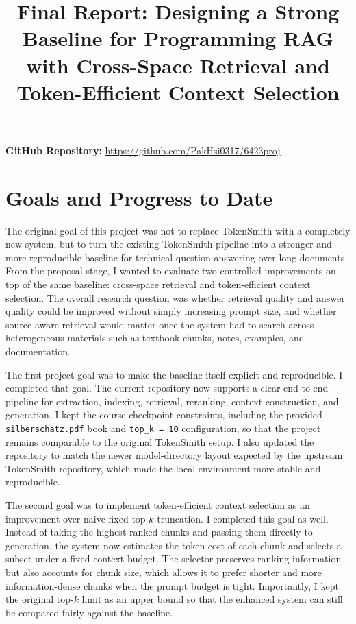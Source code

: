 \documentclass[10pt,twocolumn]{article}
\begin{document}
\title{\vspace{-1.2em}Final Report: Designing a Strong Baseline for Programming RAG with Cross-Space Retrieval and Token-Efficient Context Selection\vspace{-0.8em}}
\author{}
\date{}
\maketitle
\thispagestyle{empty}

\textbf{GitHub Repository:} \url{https://github.com/PakHsi0317/6423proj}

\section*{Goals and Progress to Date}
The original goal of this project was not to replace TokenSmith with a completely new system, but to turn the existing TokenSmith pipeline into a stronger and more reproducible baseline for technical question answering over long documents. From the proposal stage, I wanted to evaluate two controlled improvements on top of the same baseline: cross-space retrieval and token-efficient context selection. The overall research question was whether retrieval quality and answer quality could be improved without simply increasing prompt size, and whether source-aware retrieval would matter once the system had to search across heterogeneous materials such as textbook chunks, notes, examples, and documentation.

The first project goal was to make the baseline itself explicit and reproducible. I completed that goal. The current repository now supports a clear end-to-end pipeline for extraction, indexing, retrieval, reranking, context construction, and generation. I kept the course checkpoint constraints, including the provided \texttt{silberschatz.pdf} book and \texttt{top\_k = 10} configuration, so that the project remains comparable to the original TokenSmith setup. I also updated the repository to match the newer model-directory layout expected by the upstream TokenSmith repository, which made the local environment more stable and reproducible.

The second goal was to implement token-efficient context selection as an improvement over naive fixed top-$k$ truncation. I completed this goal as well. Instead of taking the highest-ranked chunks and passing them directly to generation, the system now estimates the token cost of each chunk and selects a subset under a fixed context budget. The selector preserves ranking information but also accounts for chunk size, which allows it to prefer shorter and more information-dense chunks when the prompt budget is tight. Importantly, I kept the original top-$k$ limit as an upper bound so that the enhanced system can still be compared fairly against the baseline.
\end{document}
